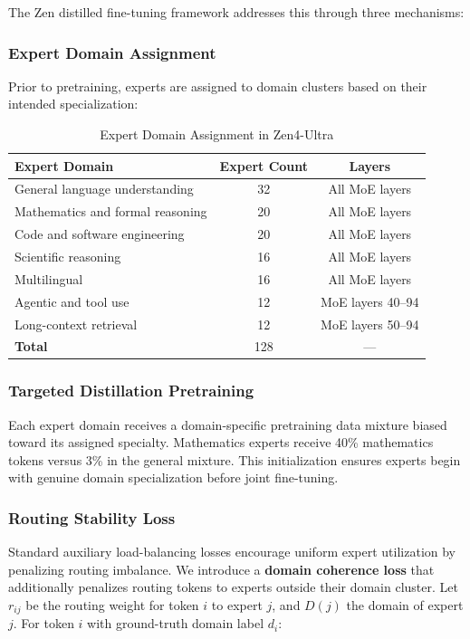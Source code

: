 \documentclass[11pt,a4paper]{article}
\begin{document}
The Zen distilled fine-tuning framework addresses this through three mechanisms:

\subsubsection{Expert Domain Assignment}

Prior to pretraining, experts are assigned to domain clusters based on their intended
specialization:

\begin{table}[H]
\centering
\begin{tabular}{lcc}
\toprule
\textbf{Expert Domain} & \textbf{Expert Count} & \textbf{Layers} \\
\midrule
General language understanding & 32 & All MoE layers \\
Mathematics and formal reasoning & 20 & All MoE layers \\
Code and software engineering  & 20 & All MoE layers \\
Scientific reasoning           & 16 & All MoE layers \\
Multilingual                   & 16 & All MoE layers \\
Agentic and tool use           & 12 & MoE layers 40--94 \\
Long-context retrieval         & 12 & MoE layers 50--94 \\
\midrule
\textbf{Total}                 & 128 & --- \\
\bottomrule
\end{tabular}
\caption{Expert Domain Assignment in Zen4-Ultra}
\end{table}

\subsubsection{Targeted Distillation Pretraining}

Each expert domain receives a domain-specific pretraining data mixture biased toward
its assigned specialty. Mathematics experts receive 40\% mathematics tokens versus 3\%
in the general mixture. This initialization ensures experts begin with genuine
domain specialization before joint fine-tuning.

\subsubsection{Routing Stability Loss}

Standard auxiliary load-balancing losses encourage uniform expert utilization by penalizing
routing imbalance. We introduce a \textbf{domain coherence loss} that additionally penalizes
routing tokens to experts outside their domain cluster. Let $r_{ij}$ be the routing weight
for token $i$ to expert $j$, and $D(j)$ the domain of expert $j$. For token $i$ with
ground-truth domain label $d_i$:
\end{document}
